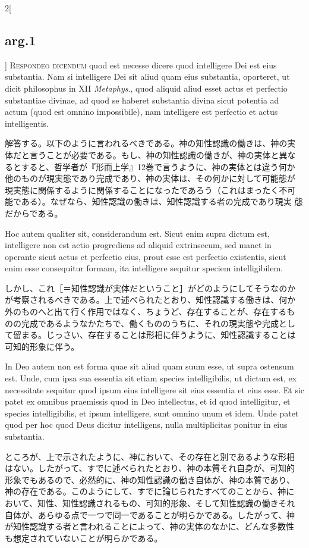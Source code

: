 \documentclass[paper=a4paper,fontsize=10pt,jafontsize=9pt,titlepage]{jlreq}
\begin{document}
\begin{paracol}{2}[\subsection{arg.1}]
{\scshape Respondeo dicendum} quod est necesse dicere quod intelligere
Dei est eius substantia. Nam si intelligere Dei sit aliud quam eius
substantia, oporteret, ut dicit philosophus in XII {\itshape
Metaphys}., quod aliquid aliud esset actus et perfectio substantiae
divinae, ad quod se haberet substantia divina sicut potentia ad actum
(quod est omnino impossibile), nam intelligere est perfectio et actus
intelligentis.

\switchcolumn

解答する。以下のように言われるべきである。神の知性認識の働きは、神の実
体だと言うことが必要である。もし、神の知性認識の働きが、神の実体と異な
るとすると、哲学者が『形而上学』12巻で言うように、神の実体とは違う何か
他のものが現実態であり完成であり、神の実体は、その何かに対して可能態が
現実態に関係するように関係することになったであろう（これはまったく不可
能である）。なぜなら、知性認識の働きは、知性認識する者の完成であり現実
態だからである。

\switchcolumn*

Hoc autem qualiter sit, considerandum est. Sicut enim supra dictum
est, intelligere non est actio progrediens ad aliquid extrinsecum, sed
manet in operante sicut actus et perfectio eius, prout esse est
perfectio existentis, sicut enim esse consequitur formam, ita
intelligere sequitur speciem intelligibilem.

\switchcolumn

しかし、これ［＝知性認識が実体だということ］がどのようにしてそうなのか
が考察されるべきである。上で述べられたとおり、知性認識する働きは、何か
外のものへと出て行く作用ではなく、ちょうど、存在することが、存在するも
のの完成であるようなかたちで、働くもののうちに、それの現実態や完成とし
て留まる。じっさい、存在することは形相に伴うように、知性認識することは
可知的形象に伴う。

\switchcolumn*

In Deo autem non est forma quae sit aliud quam suum esse, ut supra
ostensum est.  Unde, cum ipsa sua essentia sit etiam species
intelligibilis, ut dictum est, ex necessitate sequitur quod ipsum eius
intelligere sit eius essentia et eius esse. Et sic patet ex omnibus
praemissis quod in Deo intellectus, et id quod intelligitur, et
species intelligibilis, et ipsum intelligere, sunt omnino unum et
idem. Unde patet quod per hoc quod Deus dicitur intelligens, nulla
multiplicitas ponitur in eius substantia.

\switchcolumn

ところが、上で示されたように、神において、その存在と別であるような形相
はない。したがって、すでに述べられたとおり、神の本質それ自身が、可知的
形象でもあるので、必然的に、神の知性認識の働き自体が、神の本質であり、
神の存在である。このようにして、すでに論じられたすべてのことから、神に
おいて、知性、知性認識されるもの、可知的形象、そして知性認識の働きそれ
自体が、あらゆる点で一つで同一であることが明らかである。したがって、神
が知性認識する者と言われることによって、神の実体のなかに、どんな多数性
も想定されていないことが明らかである。


\end{paracol}
\end{document}
